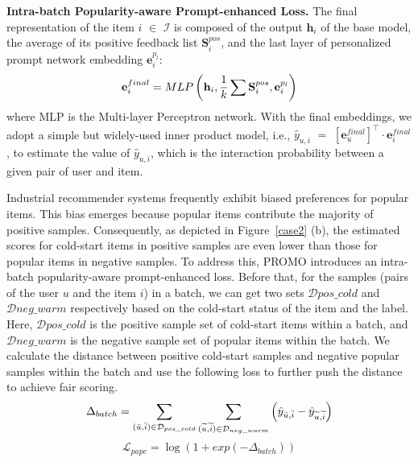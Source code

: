 \documentclass[sigconf]{acmart}
\newcommand{\sys}{\textsc{PROMO}\xspace}
\begin{document}
\textbf{Intra-batch Popularity-aware Prompt-enhanced Loss.} 
The final representation of the item $i$ $\in$ $\mathcal{I}$ is composed of the output $\mathbf{h}_i$ of the base model, the average of its positive feedback list $\mathbf{S}_i^{pos}$, and the last layer of personalized prompt network embedding $\mathbf{e}_i^{p_l}$: 
\begin{equation} \small
\mathbf{e}_i^{final} = MLP\left(\mathbf{h}_i, \frac{1}{k}\sum\mathbf{S}_i^{pos}, \mathbf{e}_i^{p_l}\right)
\end{equation}
where MLP is the Multi-layer Perceptron network. 
With the final embeddings, we adopt a simple but widely-used inner product model, i.e., $\hat{y}_{u, i}$ $=$ $\left[\mathbf{e}_u^{final}\right]^\top \cdot \mathbf{e}_i^{final}$, to estimate the value of $\hat{y}_{u, i}$, which is the interaction probability between a given pair of user and item. 

Industrial recommender systems frequently exhibit biased preferences for popular items. 
This bias emerges because popular items contribute the majority of positive samples.
Consequently, as depicted in Figure~\ref{case2} (b), the estimated scores for cold-start items in positive samples are even lower than those for popular items in negative samples. 
To address this, \sys introduces an intra-batch popularity-aware prompt-enhanced loss. Before that, for the samples (pairs of the user $u$ and the item $i$) in a batch, we can get two sets $\mathcal{D}{{pos\_cold}}$ and $\mathcal{D}{neg\_warm}$ respectively based on the cold-start status of the item and the label. 
Here, $\mathcal{D}{pos\_cold}$ is the positive sample set of cold-start items within a batch, and $\mathcal{D}{neg\_warm}$ is the negative sample set of popular items within the batch. 
We calculate the distance between positive cold-start samples and negative popular samples within the batch and use the following loss to further push the distance to achieve fair scoring.
\begin{equation} \small
\Delta_{batch} = \sum_{(\bar{u}, \bar{i}) \in \mathcal{D}_{pos\_cold}} \sum_{(\widetilde{u}, \widetilde{i}) \in \mathcal{D}_{neg\_warm}} 
 \left(\hat{y}_{\bar{u}, \bar{i}} - \hat{y}_{\widetilde{u}, \widetilde{i}}\right)
\end{equation}
\begin{equation}
\mathcal{L}_{pape} = \log \left(1 + exp\left(- \Delta_{batch}\right)\right)
\end{equation}
\end{document}
